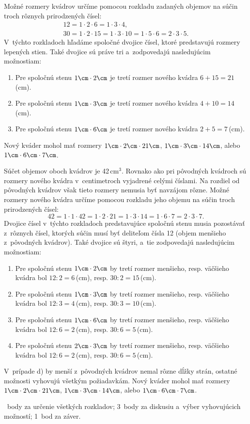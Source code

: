 {%
Možné rozmery kvádrov určíme pomocou rozkladu zadaných objemov na súčin troch rôznych prirodzených čísel:
$$
\begin{gathered}
12 =1\cdot2\cdot6 =1\cdot3\cdot4, \\
30 =1\cdot2\cdot15 =1\cdot3\cdot10 =1\cdot5\cdot6 =2\cdot3\cdot5.
\end{gathered}
$$
V~týchto rozkladoch hľadáme spoločné dvojice čísel, ktoré predstavujú rozmery lepených stien.
Také dvojice sú práve tri a~zodpovedajú nasledujúcim možnostiam:
\begin{enumerate}\alphatrue
\item Pre spoločnú stenu $1\cm\times 2\cm$ je tretí rozmer nového kvádra $6+15=21$\,(cm).
\item Pre spoločnú stenu $1\cm\times 3\cm$ je tretí rozmer nového kvádra $4+10=14$\,(cm).
\item Pre spoločnú stenu $1\cm\times 6\cm$ je tretí rozmer nového kvádra $2+5=7$\,(cm).
\end{enumerate}

Nový kváder mohol mať rozmery $1\cm\times 2\cm\times21\cm$, $1\cm\times 3\cm\times14\cm$, alebo $1\cm\times 6\cm\times7\cm$.

\ineriesenie
Súčet objemov oboch kvádrov je 42\,cm$^3$.
Rovnako ako pri pôvodných kvádroch sú rozmery nového kvádra v~centimetroch vyjadrené celými číslami.
Na rozdiel od pôvodných kvádrov však tieto rozmery nemusia byť navzájom rôzne.
Možné rozmery nového kvádra určíme pomocou rozkladu jeho objemu na súčin troch prirodzených čísel:
$$
42 =1\cdot1\cdot42 =1\cdot2\cdot21 =1\cdot3\cdot14 =1\cdot6\cdot7 =2\cdot3\cdot7.
$$
Dvojice čísel v~týchto rozkladoch predstavujúce spoločnú stenu musia pozostávať z~rôznych čísel, ktorých súčin musí byť deliteľom čísla 12 (objem menšieho z~pôvodných kvádrov).
Také dvojice sú štyri, a~tie zodpovedajú nasledujúcim možnostiam:
\begin{enumerate}\alphatrue
\item Pre spoločnú stenu $1\cm\times 2\cm$ by tretí rozmer menšieho, resp. väčšieho kvádra bol $12:2=6$\,(cm), resp. $30:2=15$\,(cm).
\item Pre spoločnú stenu $1\cm\times 3\cm$ by tretí rozmer menšieho, resp. väčšieho kvádra bol $12:3=4$\,(cm), resp. $30:3=10$\,(cm).
\item Pre spoločnú stenu $1\cm\times 6\cm$ by tretí rozmer menšieho, resp. väčšieho kvádra bol $12:6=2$\,(cm), resp. $30:6=5$\,(cm).
\item Pre spoločnú stenu $2\cm\times 3\cm$ by tretí rozmer menšieho, resp. väčšieho kvádra bol $12:6=2$\,(cm), resp. $30:6=5$\,(cm).
\end{enumerate}
V~prípade d) by menší z~pôvodných kvádrov nemal rôzne dĺžky strán, ostatné možnosti vyhovujú všetkým požiadavkám.
Nový kváder mohol mať rozmery $1\cm\times 2\cm\times21\cm$, $1\cm\times 3\cm\times14\cm$, alebo $1\cm\times 6\cm\times7\cm$.

~body za určenie všetkých rozkladov;
3~body za diskusiu a~výber vyhovujúcich možností;
1~bod za záver.
\endhodnotenie
}

